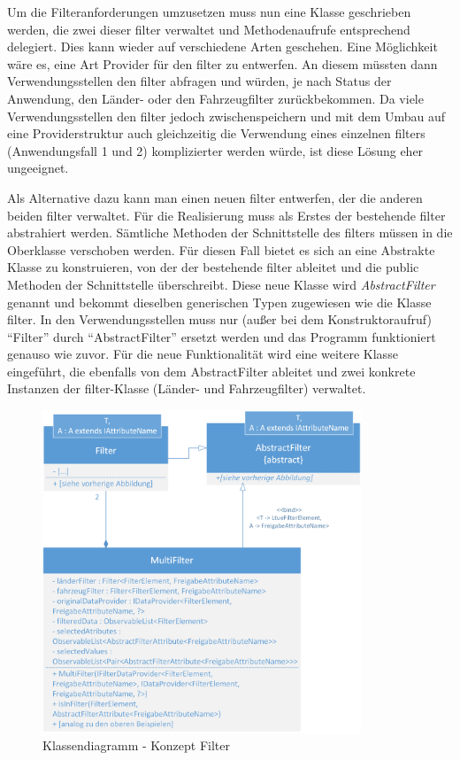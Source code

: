 Um die Filteranforderungen umzusetzen muss nun eine Klasse geschrieben werden, die zwei dieser \gls{filter} verwaltet und Methodenaufrufe entsprechend delegiert. Dies kann wieder auf verschiedene Arten geschehen. Eine Möglichkeit wäre es, eine Art Provider für den \gls{filter} zu entwerfen. An diesem müssten dann Verwendungsstellen den \gls{filter} abfragen und würden, je nach Status der Anwendung, den Länder- oder den Fahrzeugfilter zurückbekommen. Da viele Verwendungsstellen den \gls{filter} jedoch zwischenspeichern und mit dem Umbau auf eine Providerstruktur auch gleichzeitig die Verwendung eines einzelnen \gls{filter}s (Anwendungsfall 1 und 2) komplizierter werden würde, ist diese Lösung eher ungeeignet.

Als Alternative dazu kann man einen neuen \gls{filter} entwerfen, der die anderen beiden \gls{filter} verwaltet. Für die Realisierung muss als Erstes der bestehende \gls{filter} abstrahiert werden. Sämtliche Methoden der Schnittstelle des \gls{filter}s müssen in die Oberklasse verschoben werden. Für diesen Fall bietet es sich an eine Abstrakte Klasse zu konstruieren, von der der bestehende \gls{filter} ableitet und die public Methoden der Schnittstelle überschreibt. Diese neue Klasse wird \textit{AbstractFilter} genannt und bekommt dieselben generischen Typen zugewiesen wie die Klasse \gls{filter}. In den Verwendungsstellen muss nur (außer bei dem Konstruktoraufruf) \enquote{Filter} durch \enquote{AbstractFilter} ersetzt werden und das Programm funktioniert genauso wie zuvor. Für die neue Funktionalität wird eine weitere Klasse eingeführt, die ebenfalls von dem AbstractFilter ableitet und zwei konkrete Instanzen der \gls{filter}-Klasse (Länder- und Fahrzeugfilter) verwaltet.

\begin{figure}[H]
 \centering
 \includegraphics[width=0.85\textwidth]{grafiken/Class_MultiFilter.png}
 \caption{Klassendiagramm - Konzept Filter}
 \label{fig:multiFilter2}
\end{figure}

